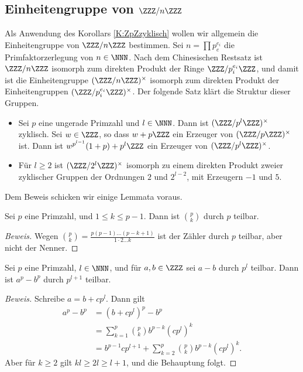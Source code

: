 \documentclass[12pt,a4paper,twoside]{article}
\begin{document}
\subsection{Einheitengruppe von $\ZZZ/n\ZZZ$}
Als Anwendung des Korollars \ref{K:ZpZzyklisch} wollen wir allgemein die
Einheitengruppe von $\ZZZ/n\ZZZ$ bestimmen. Sei $n=\prod p_e^{e_i}$ die
Primfaktorzerlegung von $n\in\NNN$. Nach dem Chinesischen Restsatz ist
$\ZZZ/n\ZZZ$ isomorph zum direkten Produkt der Ringe $\ZZZ/p_i^{e_i}\ZZZ$, und
damit ist die Einheitengruppe $(\ZZZ/n\ZZZ)^\times$ isomorph zum direkten
Produkt der Einheitengruppen $(\ZZZ/p_i^{e_i}\ZZZ)^\times$. Der folgende Satz
kl\"art die Struktur dieser Gruppen.
\begin{Satz}\label{S:ZnZ}
  \begin{itemize}
  \item[(a)] Sei $p$ eine ungerade Primzahl und $l\in\NNN$. Dann ist
    $(\ZZZ/p^l\ZZZ)^\times$ zyklisch. Sei $w\in\ZZZ$, so dass $w+p\ZZZ$ ein
    Erzeuger von $(\ZZZ/p\ZZZ)^\times$ ist. Dann ist
    $w^{p^{l-1}}(1+p)+p^l\ZZZ$ ein Erzeuger von $(\ZZZ/p^l\ZZZ)^\times$.
  \item[(b)] F\"ur $l\ge2$ ist $(\ZZZ/2^l\ZZZ)^\times$ isomorph zu einem
    direkten Produkt zweier zyklischer Gruppen der Ordnungen $2$ und
    $2^{l-2}$, mit Erzeugern $-1$ und $5$.
  \end{itemize}
\end{Satz}
Dem Beweis schicken wir einige Lemmata voraus.
\begin{Lemma}\label{L:pk}
  Sei $p$ eine Primzahl, und $1\le k\le p-1$. Dann ist $\binom{p}{k}$ durch
  $p$ teilbar.
\end{Lemma}
\begin{proof}[Beweis]
  Wegen $\binom{p}{k}=\frac{p(p-1)\dots(p-k+1)}{1\cdot2\dots k}$ ist der
  Z\"ahler durch $p$ teilbar, aber nicht der Nenner.
\end{proof}
\begin{Lemma}\label{L:ap-bp}
  Sei $p$ eine Primzahl, $l\in\NNN$, und f\"ur $a,b\in\ZZZ$ sei $a-b$ durch
  $p^l$ teilbar. Dann ist $a^p-b^p$ durch $p^{l+1}$ teilbar.
\end{Lemma}
\begin{proof}[Beweis]
  Schreibe $a=b+cp^l$. Dann gilt
  \begin{align*}
    a^p-b^p &= (b+cp^l)^p-b^p\\
&= \sum_{k=1}^p\binom{p}{k}b^{p-k}(cp^l)^k\\
&= b^{p-1}cp^{l+1}+\sum_{k=2}^p\binom{p}{k}b^{p-k}(cp^l)^k.
  \end{align*}
Aber f\"ur $k\ge2$ gilt $kl\ge 2l\ge l+1$, und die Behauptung folgt.
\end{proof}
\end{document}
